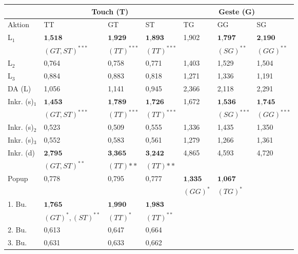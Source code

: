 \begin{table}[ht]
  \centering
	\begin{tabular}{|l|l|l|l|l|l|l|}
		\hline
		& 					\multicolumn{3}{|c|}{Touch (T)} & \multicolumn{3}{|c|}{Geste (G)}\\
		\hline
		Aktion 					& TT 	& GT 	& ST 	& TG 	& GG 	& SG 	\\
		\hline
		L$_1$				& $\textbf{1,518}$ 				& $\textbf{1,929}$				& $\textbf{1,893}$ 				&	1,902	&	$\textbf{1,797}$					&	$\textbf{2,190}$		\\
									& \small{$(GT, ST)^{***}$}	&	\small{$(TT)^{***}$}			& \small{$(TT)^{***}$}			&				&	\small{$(SG)^{**}$}				&	\small{$(GG)^{**}$}	\\
		\hline
		L$_2$			& 0,764 & 0,758	& 0,771 &	1,403	&	1,529	&	1,504 \\
		\hline
		L$_3$				& 0,884 & 0,883	& 0,818 &	1,271	&	1,336	&	1,191	\\
		\hline
		DA (L)				& 1,056 & 1,141	& 0,945 &	2,366	&	2,118	&	2,291	\\
		\hline
		Inkr. (s)$_1$				& $\textbf{1,453}$ 				& $\textbf{1,789}$		& $\textbf{1,726}$ 			&	1,672	&	$\textbf{1,536}$			&	$\textbf{1,745}$\\
									& \small{$(GT,ST)^{***}$} 	& \small{$(TT)^{***}$}	& \small{$(TT)^{***}$} 	&				&	\small{$(SG)^{***}$}		&	\small{$(GG)^{***}$}\\
		\hline
		Inkr. (s)$_2$				& 0,523 & 0,509	& 0,555 &	1,336	&	1,435	&	1,350\\
		\hline
		Inkr. (s)$_3$				& 0,552 & 0,583	& 0,561 &	1,279	&	1,266	&	1,361\\
		\hline
		Inkr. (d) 				& $\textbf{2,795}$ & $\textbf{3,365}$	& $\textbf{3,242}$ &	4,865	&	4,593	&	4,720\\		
									& \small{$(GT,ST)^{**}$} & \small{$(TT){**}$}	& \small{$(TT){**}$}  &	&	&	\\	
		\hline				
		Popup 				& 0,778 & 0,795	& 0,777 &	$\textbf{1,335}$		&	$\textbf{1,067}$ &\\	
									& 			& 			&  			&	\small{$(GG)^{*}$}	&	\small{$(TG)^{*}$} &		\\	
		\hline
		1. Bu.  		& $\textbf{1,765}$ 						& $\textbf{1,990}$		& $\textbf{1,983}$ 	&				& 			&   \\
									& \small{$(GT)^{*},(ST)^{**}$}	& \small{$(TT)^{*}$}		& \small{$(TT)^{**}$}&			& 		& 	\\
		\hline	
		2. Bu.  		& 0,613 & 0,647	& 0,664 &			& 			& 	 \\
		\hline
		3. Bu.  		& 0,631 & 0,633	& 0,662 &				& 			& \\

\end{tabular}
\end{table}

